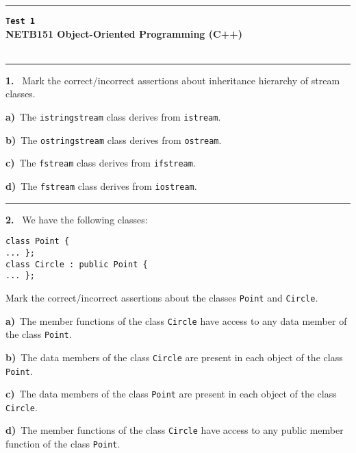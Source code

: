 \newpage\thispagestyle{empty}\par 
\hrule 
\begin{center}
{\bf\large {}}\hfill {\bf\large\verb|Test 1|}
 \hfill{\bf\large {}}\\ 
{\bf\large NETB151 Object-Oriented Programming (C++)}\\[4pt]
{\bf \large {}}\\ 
\end{center}\par
 \vspace{-4mm}
\begin{multicols}{2}
\par\smallskip\hrule\par\medskip

{\bf 1. }\ Mark the correct/incorrect assertions about inheritance
hierarchy of stream classes.

{\bf a)}\ The \verb|istringstream| class derives from \verb|istream|.

{\bf b)}\ The \verb|ostringstream| class derives from \verb|ostream|.

{\bf c)}\ The \verb|fstream| class derives from \verb|ifstream|.

{\bf d)}\ The \verb|fstream| class derives from \verb|iostream|.

\par\smallskip\hrule\par\medskip

{\bf 2. }\ We have the following classes:
 \vspace{-3mm}\begin{verbatim}
class Point {
... };
class Circle : public Point {
... };
 \end{verbatim}\vspace{-6mm}
Mark the correct/incorrect assertions about the classes
\verb|Point| and \verb|Circle|.

{\bf a)}\ The member functions of the class \verb|Circle| have access to any data member of the class \verb|Point|.

{\bf b)}\ The data members of the class \verb|Circle| are present in each object of the class \verb|Point|.

{\bf c)}\ The data members of the class \verb|Point| are present in each object of the class \verb|Circle|.

{\bf d)}\ The member functions of the class \verb|Circle| have access to any public member function of the class \verb|Point|.


\end{multicols}
